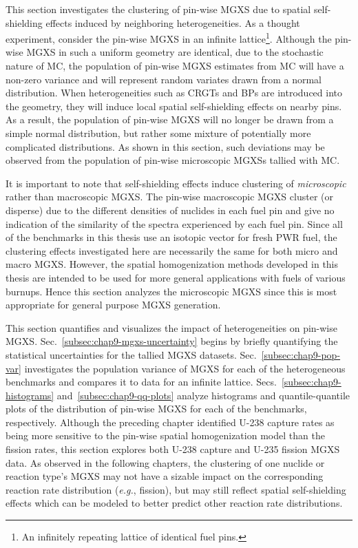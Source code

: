 This section investigates the clustering of pin-wise \ac{MGXS} due to spatial self-shielding effects induced by neighboring heterogeneities. As a thought experiment, consider the pin-wise \ac{MGXS} in an infinite lattice\footnote{An infinitely repeating lattice of identical fuel pins.}. Although the pin-wise \ac{MGXS} in such a uniform geometry are identical, due to the stochastic nature of \ac{MC}, the population of pin-wise \ac{MGXS} estimates from \ac{MC} will have a non-zero variance and will represent random variates drawn from a normal distribution. When heterogeneities such as \acp{CRGT} and \acp{BP} are introduced into the geometry, they will induce local spatial self-shielding effects on nearby pins. As a result, the population of pin-wise \ac{MGXS} will no longer be drawn from a simple normal distribution, but rather some mixture of potentially more complicated distributions. As shown in this section, such deviations may be observed from the population of pin-wise microscopic \acp{MGXS} tallied with \ac{MC}.

It is important to note that self-shielding effects induce clustering of \textit{microscopic} rather than macroscopic \ac{MGXS}. The pin-wise macroscopic \ac{MGXS} cluster (or disperse) due to the different densities of nuclides in each fuel pin and give no indication of the similarity of the spectra experienced by each fuel pin. Since all of the benchmarks in this thesis use an isotopic vector for fresh \ac{PWR} fuel, the clustering effects investigated here are necessarily the same for both micro and macro \ac{MGXS}. However, the spatial homogenization methods developed in this thesis are intended to be used for more general applications with fuels of various burnups. Hence this section analyzes the microscopic \ac{MGXS} since this is most appropriate for general purpose \ac{MGXS} generation.

This section quantifies and visualizes the impact of heterogeneities on pin-wise \ac{MGXS}. 
Sec.~\ref{subsec:chap9-mgxs-uncertainty} begins by briefly quantifying the statistical uncertainties for the tallied \ac{MGXS} datasets. Sec.~\ref{subsec:chap9-pop-var} investigates the population variance of \ac{MGXS} for each of the heterogeneous benchmarks and compares it to data for an infinite lattice. Secs.~\ref{subsec:chap9-histograms} and~\ref{subsec:chap9-qq-plots} analyze histograms and quantile-quantile plots of the distribution of pin-wise \ac{MGXS} for each of the benchmarks, respectively. Although the preceding chapter identified U-238 capture rates as being more sensitive to the pin-wise spatial homogenization model than the fission rates, this section explores both U-238 capture and U-235 fission \ac{MGXS} data. As observed in the following chapters, the clustering of one nuclide or reaction type's \ac{MGXS} may not have a sizable impact on the corresponding reaction rate distribution (\textit{e.g.}, fission), but may still reflect spatial self-shielding effects which can be modeled to better predict other reaction rate distributions.

